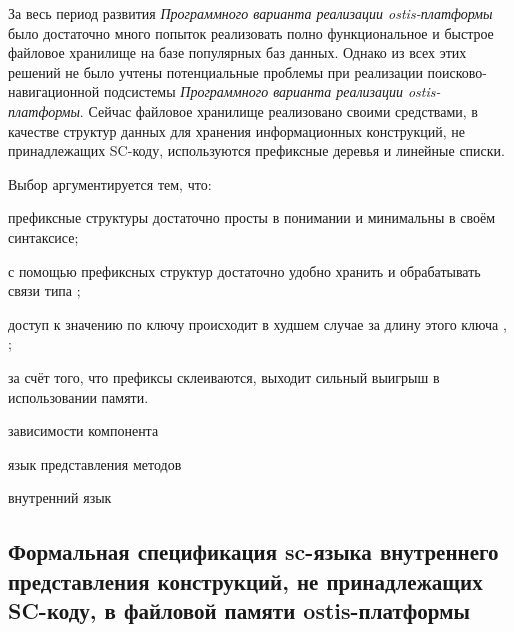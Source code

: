 За весь период развития \textit{Программного варианта реализации ostis-платформы} было достаточно много попыток реализовать полно функциональное и быстрое файловое хранилище на базе популярных баз данных. Однако из всех этих решений не было учтены потенциальные проблемы при реализации поисково-навигационной подсистемы \textit{Программного варианта реализации ostis-платформы}. Сейчас файловое хранилище реализовано своими средствами, в качестве структур данных для хранения информационных конструкций, не принадлежащих SC-коду, используются префиксные деревья  и линейные списки.

Выбор аргументируется тем, что:
\begin{textitemize}
    \item префиксные структуры достаточно просты в понимании и минимальны в своём синтаксисе;
    \item с помощью префиксных структур достаточно удобно хранить и обрабатывать связи типа ;
    \item доступ к значению по ключу происходит в худшем случае за длину этого ключа \cite{tsuruta2022cPrefixTree}, ;
    \item за счёт того, что префиксы склеиваются, выходит сильный выигрыш в использовании памяти.
\end{textitemize}

\begin{SCn}
\begin{scnrelfromset}{зависимости компонента}
\end{scnrelfromset}
\begin{scnrelfromlist}{язык представления методов}
\end{scnrelfromlist}
\begin{scnrelfromlist}{внутренний язык}
\end{scnrelfromlist}
\end{SCn}

\subsection{Формальная спецификация sc-языка внутреннего представления конструкций, не принадлежащих SC-коду, в файловой памяти ostis-платформы}
\label{sec_soft_platform_scfin_code}

